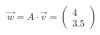 \documentclass[preview]{standalone}
\begin{document}
\begin{align*}
\vec{w} = A \cdot \vec{v} = \begin{pmatrix} 4 \\ 3.5 \end{pmatrix}
\end{align*}
\end{document}
